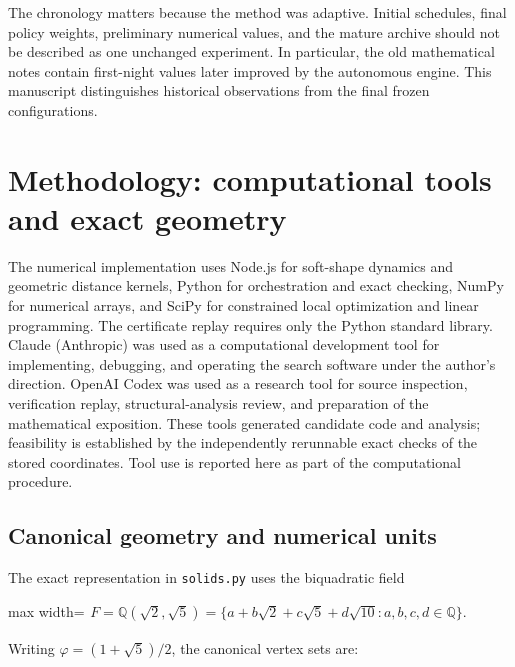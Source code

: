 \documentclass[11pt,a4paper]{article}
\begin{document}
The chronology matters because the method was adaptive. Initial schedules, final policy weights, preliminary numerical values, and the mature archive should not be described as one unchanged experiment. In particular, the old mathematical notes contain first-night values later improved by the autonomous engine. This manuscript distinguishes historical observations from the final frozen configurations.

\section{Methodology: computational tools and exact geometry}

The numerical implementation uses Node.js for soft-shape dynamics and geometric distance kernels, Python for orchestration and exact checking, NumPy for numerical arrays, and SciPy for constrained local optimization and linear programming. The certificate replay requires only the Python standard library. Claude (Anthropic) was used as a computational development tool for implementing, debugging, and operating the search software under the author's direction. OpenAI Codex was used as a research tool for source inspection, verification replay, structural-analysis review, and preparation of the mathematical exposition. These tools generated candidate code and analysis; feasibility is established by the independently rerunnable exact checks of the stored coordinates. Tool use is reported here as part of the computational procedure.

\subsection{Canonical geometry and numerical units}

The exact representation in \nolinkurl{solids.py} uses the biquadratic field

\begin{center}\begin{adjustbox}{max width=\linewidth}$\displaystyle\begin{aligned}
F=\mathbb Q(\sqrt2,\sqrt5)
=\{a+b\sqrt2+c\sqrt5+d\sqrt{10}:a,b,c,d\in\mathbb Q\}.
\end{aligned}$\end{adjustbox}\end{center}

Writing \(\varphi=(1+\sqrt5)/2\), the canonical vertex sets are:
\end{document}

